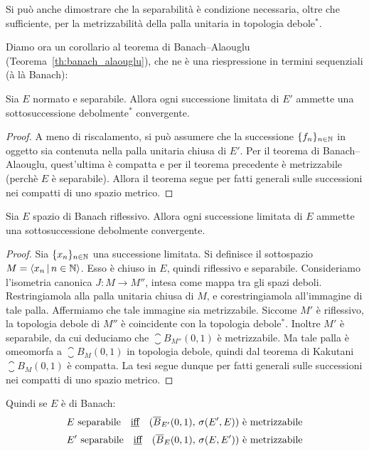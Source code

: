 \begin{remark}
	Si può anche dimostrare che la separabilità è condizione necessaria, oltre che sufficiente, per la metrizzabilità della palla unitaria in topologia debole$^*$.
\end{remark}

Diamo ora un corollario al teorema di Banach--Alaouglu (Teorema~\ref{th:banach_alaouglu}), che ne è una riespressione in termini sequenziali (à là Banach):

\begin{corollary}
\label{cor:weaktop_three}
	Sia $E$ normato e separabile.
	Allora ogni successione limitata di $E'$ ammette una sottosuccessione debolmente$^*$ convergente.
\end{corollary}
\begin{proof}
	A meno di riscalamento, si può assumere che la successione $\{f_n\}_{n \in \mathbb{N}}$ in oggetto sia contenuta nella palla unitaria chiusa di $E'$. Per il teorema di Banach--Alaouglu, quest'ultima è compatta e per il teorema precedente è metrizzabile (perchè $E$ è separabile). Allora il teorema segue per fatti generali sulle successioni nei compatti di uno spazio metrico.
\end{proof}

\begin{theorem}
	Sia $E$ spazio di Banach riflessivo.
	Allora ogni successione limitata di $E$ ammette una sottosuccessione debolmente convergente.
\end{theorem}
\begin{proof}
	Sia $\{x_n\}_{n \in \mathbb{N}}$ una successione limitata.
	Si definisce il sottospazio $M = \langle x_n \,|\, n \in \mathbb{N} \rangle$. Esso è chiuso in $E$, quindi riflessivo e separabile. Consideriamo l'isometria canonica $J : M \to M''$, intesa come mappa tra gli spazi deboli. Restringiamola alla palla unitaria chiusa di $M$, e corestringiamola all'immagine di tale palla.
	Affermiamo che tale immagine sia metrizzabile. Siccome $M'$ è riflessivo, la topologia debole di $M''$ è coincidente con la topologia debole$^*$. Inoltre $M'$ è separabile, da cui deduciamo che $\closure B_{M''}(0,1)$ è metrizzabile. Ma tale palla è omeomorfa a $\closure B_M(0,1)$ in topologia debole, quindi dal teorema di Kakutani $\closure B_M(0,1)$ è compatta. La tesi segue dunque per fatti generali sulle successioni nei compatti di uno spazio metrico.
\end{proof}

Quindi se $E$ è di Banach:
\begin{equation*}
	\text{$E$ separabile} \quad\text{\underline{iff}}\quad \text{$(\overline{B}_{E'}(0,1),\, \sigma(E', E))$ è metrizzabile}
\end{equation*}
\begin{equation*}
	\text{$E'$ separabile} \quad\text{\underline{iff}}\quad \text{$(\overline{B}_E(0,1),\, \sigma(E, E'))$ è metrizzabile}
\end{equation*}

